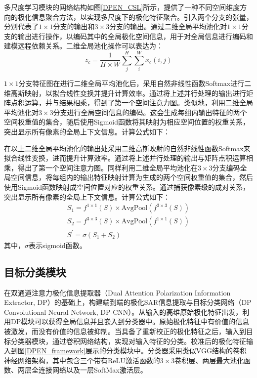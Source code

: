 多尺度学习模块的网络结构如图\ref{DPEN_CSL}所示，提供了一种不同空间维度方向的极化信息聚合方法，以实现多尺度下的极化特征聚合。引入两个分支的张量，分别代表了$1\times 1$分支的输出和$3 \times 3$分支的输出。通过二维全局平均池化对$1\times 1$分支的输出进行操作，以编码其中的全局极化空间信息，用于对全局信息进行编码和建模远程依赖关系。二维全局池化操作可以表达为：
\begin{equation}
    z_c=\frac{1}{H\times W}\sum_{j}^{H}\sum_{i}^{W}x_c(i,j)
\end{equation}

$1\times 1$分支特征图在进行二维全局平均池化后，采用自然非线性函数Softmax进行二维高斯映射，以拟合线性变换并提升计算效率。通过将上述并行处理的输出进行矩阵点积运算，并与结果相乘，得到了第一个空间注意力图。类似地，利用二维全局平均池化对$3\times 3$分支进行全局空间信息的编码。这会生成每组内输出特征的两个空间权重值的集合，随后使用Sigmoid函数将其映射为相应空间位置的权重关系，突出显示所有像素的全局上下文信息。计算公式如下：

在以上二维全局平均池化的输出处采用二维高斯映射的自然非线性函数Softmax来拟合线性变换，进而提升计算效率。通过将上述并行处理的输出与矩阵点积运算相乘，得出了第一个空间注意力图。同样利用二维全局平均池化在$3\times 3$分支编码全局空间信息，将每组内的输出特征映射计算为生成的两个空间权重值的集合，然后使用Sigmoid函数映射成空间位置对应的权重关系。通过捕获像素级的成对关系，突出显示所有像素的全局上下文信息。计算公式如下：
\begin{gather}
    S_1=f^{1\times 1}\left( S \right) \times \mathrm{AvgPool}\left( f^{3\times 3}\left( S \right) \right)
    \\
    S_2=f^{3\times 3}\left( S \right) \times \mathrm{AvgPool}\left( f^{1\times 1}\left( S \right) \right)
    \\
    S^{\prime}=\sigma \left( S_1+S_2 \right)
\end{gather}
其中，$\sigma$表示sigmoid函数。

\subsection{目标分类模块}
\label{sec:目标分类模块}
在双通道注意力极化信息提取器（Dual Attention Polarization Information Extractor, DP）的基础上，构建端到端的极化SAR信息提取与目标分类网络（DP Convolutional Neural Network, DP-CNN）。从输入的高维原始极化特征出发，利用DP模块可以获得全局信息并且嵌入到分类器中。原始极化特征中有价值的信息被激发，而没有价值的信息被抑制。当具备了重新校正的极化特征之后，输入到目标分类器模块，通过卷积网络结构，实现对输入特征的分类。校准后的极化特征输入到图\ref{DPEN_framework}展示的分类模块中。分类器采用类似VGG结构的卷积神经网络架构，其中包含三个带有ReLU激活函数的$3\times 3$卷积层、两层最大池化函数、两层全连接网络以及一层SoftMax激活层。

